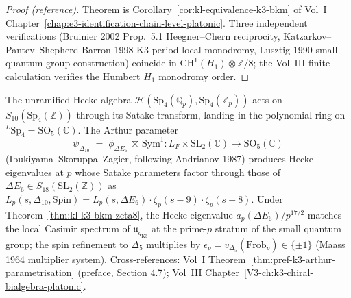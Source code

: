 \begin{proof}[Proof (reference)]
Theorem is Corollary~\ref{cor:kl-equivalence-k3-bkm} of Vol~I
Chapter~\ref{chap:e3-identification-chain-level-platonic}. Three
independent verifications (Bruinier 2002 Prop.~5.1 Heegner--Chern
reciprocity, Katzarkov--Pantev--Shepherd-Barron 1998 K3-period local
monodromy, Lusztig 1990 small-quantum-group construction) coincide in
$\mathrm{CH}^1(H_1)\otimes \mathbb{Z}/8$; the Vol~III finite
calculation verifies the Humbert $H_1$ monodromy order.
\end{proof}

\begin{remark}
\label{rem:hecke-action-arthur-ym}
The unramified Hecke algebra $\mathcal{H}(\mathrm{Sp}_4(\mathbb{Q}_p),
\mathrm{Sp}_4(\mathbb{Z}_p))$ acts on $S_{10}(\mathrm{Sp}_4
(\mathbb{Z}))$ through its Satake transform, landing in the polynomial
ring on ${}^L\mathrm{Sp}_4 = \mathrm{SO}_5(\mathbb{C})$. The Arthur
parameter
\[
 \psi_{\Delta_{10}}
 \;=\;
 \phi_{\Delta E_6}\,\boxtimes\,\mathrm{Sym}^1
 \colon
 L_F \times \mathrm{SL}_2(\mathbb{C})
 \longrightarrow
 \mathrm{SO}_5(\mathbb{C})
\]
(Ibukiyama--Skoruppa--Zagier, following Andrianov 1987) produces
Hecke eigenvalues at $p$ whose Satake parameters factor through those
of $\Delta E_6\in S_{18}(\mathrm{SL}_2(\mathbb{Z}))$ as
$L_p(s, \Delta_{10}, \mathrm{Spin}) = L_p(s, \Delta E_6)\cdot
\zeta_p(s-9)\cdot \zeta_p(s-8)$. Under
Theorem~\ref{thm:kl-k3-bkm-zeta8}, the Hecke eigenvalue $a_p(\Delta
E_6)/p^{17/2}$ matches the local Casimir spectrum of
$\mathfrak{u}_{q_{\mathrm{K3}}}$ at the prime-$p$ stratum of the small
quantum group; the spin refinement to $\Delta_5$ multiplies by
$\epsilon_p = v_{\Delta_5}(\mathrm{Frob}_p) \in \{\pm 1\}$ (Maass
1964 multiplier system). Cross-references: Vol~I
Theorem~\ref{thm:pref-k3-arthur-parametrisation} (preface, Section 4.7);
Vol~III Chapter~\ref{V3-ch:k3-chiral-bialgebra-platonic}.
\end{remark}

